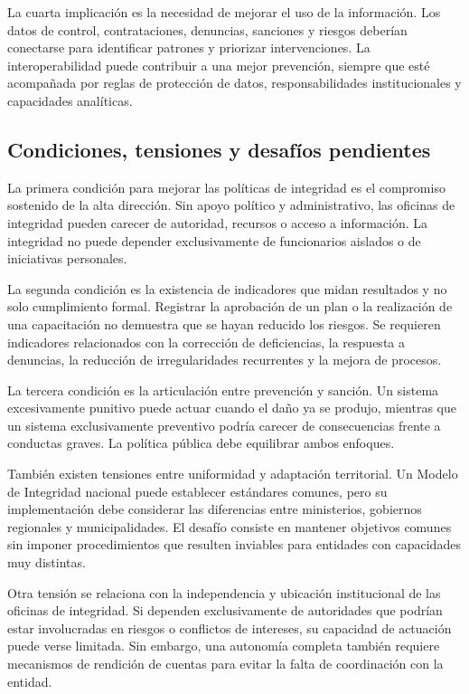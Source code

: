 \documentclass[Afour,sageh,times]{sagej}
\begin{document}
La cuarta implicación es la necesidad de mejorar el uso de la información. Los datos de control, contrataciones, denuncias, sanciones y riesgos deberían conectarse para identificar patrones y priorizar intervenciones. La interoperabilidad puede contribuir a una mejor prevención, siempre que esté acompañada por reglas de protección de datos, responsabilidades institucionales y capacidades analíticas.

\subsection{Condiciones, tensiones y desafíos pendientes}
\label{subsec:condiciones-tensiones}

La primera condición para mejorar las políticas de integridad es el compromiso sostenido de la alta dirección. Sin apoyo político y administrativo, las oficinas de integridad pueden carecer de autoridad, recursos o acceso a información. La integridad no puede depender exclusivamente de funcionarios aislados o de iniciativas personales.

La segunda condición es la existencia de indicadores que midan resultados y no solo cumplimiento formal. Registrar la aprobación de un plan o la realización de una capacitación no demuestra que se hayan reducido los riesgos. Se requieren indicadores relacionados con la corrección de deficiencias, la respuesta a denuncias, la reducción de irregularidades recurrentes y la mejora de procesos.

La tercera condición es la articulación entre prevención y sanción. Un sistema excesivamente punitivo puede actuar cuando el daño ya se produjo, mientras que un sistema exclusivamente preventivo podría carecer de consecuencias frente a conductas graves. La política pública debe equilibrar ambos enfoques.

También existen tensiones entre uniformidad y adaptación territorial. Un Modelo de Integridad nacional puede establecer estándares comunes, pero su implementación debe considerar las diferencias entre ministerios, gobiernos regionales y municipalidades. El desafío consiste en mantener objetivos comunes sin imponer procedimientos que resulten inviables para entidades con capacidades muy distintas.

Otra tensión se relaciona con la independencia y ubicación institucional de las oficinas de integridad. Si dependen exclusivamente de autoridades que podrían estar involucradas en riesgos o conflictos de intereses, su capacidad de actuación puede verse limitada. Sin embargo, una autonomía completa también requiere mecanismos de rendición de cuentas para evitar la falta de coordinación con la entidad.
\end{document}
